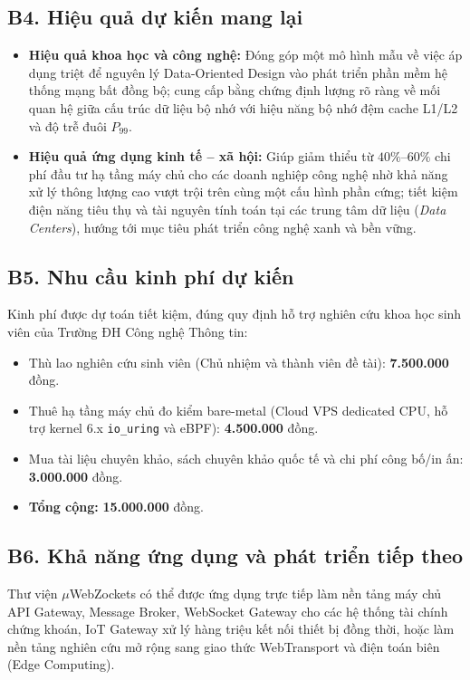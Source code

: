 \documentclass[letterpaper]{article}
\begin{document}
\subsection{B4. Hiệu quả dự kiến mang lại}

\begin{itemize}
    \item \textbf{Hiệu quả khoa học và công nghệ:} Đóng góp một mô hình mẫu về việc áp dụng triệt để nguyên lý Data-Oriented Design vào phát triển phần mềm hệ thống mạng bất đồng bộ; cung cấp bằng chứng định lượng rõ ràng về mối quan hệ giữa cấu trúc dữ liệu bộ nhớ với hiệu năng bộ nhớ đệm cache L1/L2 và độ trễ đuôi $P_{99}$.
    \item \textbf{Hiệu quả ứng dụng kinh tế -- xã hội:} Giúp giảm thiểu từ $40\%\text{--}60\%$ chi phí đầu tư hạ tầng máy chủ cho các doanh nghiệp công nghệ nhờ khả năng xử lý thông lượng cao vượt trội trên cùng một cấu hình phần cứng; tiết kiệm điện năng tiêu thụ và tài nguyên tính toán tại các trung tâm dữ liệu (\emph{Data Centers}), hướng tới mục tiêu phát triển công nghệ xanh và bền vững.
\end{itemize}

\subsection{B5. Nhu cầu kinh phí dự kiến}

Kinh phí được dự toán tiết kiệm, đúng quy định hỗ trợ nghiên cứu khoa học sinh viên của Trường ĐH Công nghệ Thông tin:
\begin{itemize}
    \item Thù lao nghiên cứu sinh viên (Chủ nhiệm và thành viên đề tài): \textbf{7.500.000} đồng.
    \item Thuê hạ tầng máy chủ đo kiểm bare-metal (Cloud VPS dedicated CPU, hỗ trợ kernel 6.x \texttt{io\_uring} và eBPF): \textbf{4.500.000} đồng.
    \item Mua tài liệu chuyên khảo, sách chuyên khảo quốc tế và chi phí công bố/in ấn: \textbf{3.000.000} đồng.
    \item \textbf{Tổng cộng:} \textbf{15.000.000} đồng.
\end{itemize}

\subsection{B6. Khả năng ứng dụng và phát triển tiếp theo}

Thư viện $\mu$WebZockets có thể được ứng dụng trực tiếp làm nền tảng máy chủ API Gateway, Message Broker, WebSocket Gateway cho các hệ thống tài chính chứng khoán, IoT Gateway xử lý hàng triệu kết nối thiết bị đồng thời, hoặc làm nền tảng nghiên cứu mở rộng sang giao thức WebTransport và điện toán biên (Edge Computing).
\end{document}

